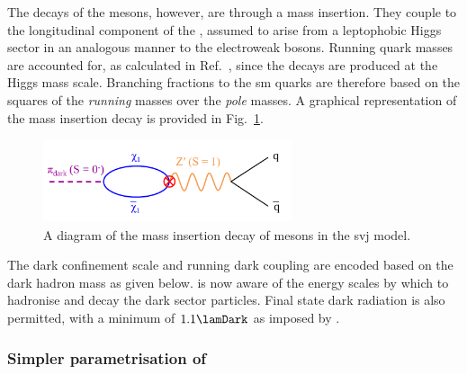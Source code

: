 The decays of the \Ppidark mesons, however, are through a mass insertion. They couple to the longitudinal component of the \PZprime, assumed to arise from a leptophobic Higgs sector in an analogous manner to the electroweak bosons. Running quark masses are accounted for, as calculated in Ref.~, since the decays are produced at the Higgs mass scale. Branching fractions to the \acrshort{sm} quarks are therefore based on the squares of the \emph{running} masses over the \emph{pole} masses. A graphical representation of the mass insertion decay is provided in Fig.~\ref{fig:svj_mass_insertion}.


\begin{figure}[htbp]
    \centering
    \includegraphics[width=0.65\textwidth]{figures/mass_insertion_diagram.pdf}
    \caption[A diagram of the mass insertion decay of \Ppidark mesons in the \schannel semi-visible jet model]{A diagram of the mass insertion decay of \Ppidark mesons in the \schannel \gls{svj} model.}
    \label{fig:svj_mass_insertion}
\end{figure}

The dark confinement scale \lamDark and running dark coupling \aDark are encoded based on the dark hadron mass as given below. \PYTHIA is now aware of the energy scales by which to hadronise and decay the dark sector particles. Final state dark radiation is also permitted, with a minimum \pt of $\text{1.1}\lamDark$ as imposed by \PYTHIA.




\subsubsection{Simpler parametrisation of \texorpdfstring{\aDark}{alpha\_dark}}
\label{subsubsec:svj_effective_alpha_dark}

